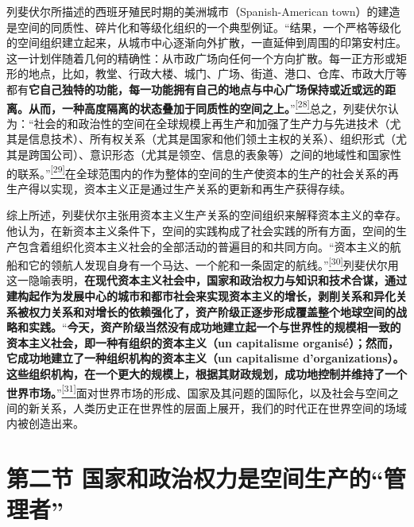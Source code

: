 \documentclass[UTF8, fontset = sourcesans, a4paper, oneside, zihao =
-4, scheme=chinese, no-math, space=true]{ctexbook}
\begin{document}
列斐伏尔所描述的西班牙殖民时期的美洲城市（Spanish-American
town）的建造是空间的同质性、碎片化和等级化组织的一个典型例证。``结果，一个严格等级化的空间组织建立起来，从城市中心逐渐向外扩散，一直延伸到周围的印第安村庄。这一计划伴随着几何的精确性：从市政广场向任何一个方向扩散。每一正方形或矩形的地点，比如，教堂、行政大楼、城门、广场、街道、港口、仓库、市政大厅等都有\textbf{它自己独特的功能，每一功能拥有自己的地点与中心广场保持或近或远的距离。从而，一种高度隔离的状态叠加于同质性的空间之上。}''\protect\hypertarget{part0007_split_001.htmlux5cux23w28}{}{}\protect\hyperlink{part0007_split_004.htmlux5cux23m28}{\textsuperscript{{[}28{]}}}总之，列斐伏尔认为：``社会的和政治性的空间在全球规模上再生产和加强了生产力与先进技术（尤其是信息技术）、所有权关系（尤其是国家和他们领土主权的关系）、组织形式（尤其是跨国公司）、意识形态（尤其是领空、信息的表象等）之间的地域性和国家性的联系。''\protect\hypertarget{part0007_split_001.htmlux5cux23w29}{}{}\protect\hyperlink{part0007_split_004.htmlux5cux23m29}{\textsuperscript{{[}29{]}}}在全球范围内的作为整体的空间的生产使资本的生产的社会关系的再生产得以实现，资本主义正是通过生产关系的更新和再生产获得存续。

综上所述，列斐伏尔主张用资本主义生产关系的空间组织来解释资本主义的幸存。他认为，在新资本主义条件下，空间的实践构成了社会实践的所有方面，空间的生产包含着组织化资本主义社会的全部活动的普遍目的和共同方向。``资本主义的航船和它的领航人发现自身有一个马达、一个舵和一条固定的航线。''\protect\hypertarget{part0007_split_001.htmlux5cux23w30}{}{}\protect\hyperlink{part0007_split_004.htmlux5cux23m30}{\textsuperscript{{[}30{]}}}列斐伏尔用这一隐喻表明，\textbf{在现代资本主义社会中，国家和政治权力与知识和技术合谋，通过建构起作为发展中心的城市和都市社会来实现资本主义的增长，剥削关系和异化关系被权力关系和对增长的依赖强化了，资产阶级正逐步形成覆盖整个地球空间的战略和实践。}``\textbf{今天，资产阶级当然没有成功地建立起一个与世界性的规模相一致的资本主义社会，即一种有组织的资本主义（un
capitalisme organisé）；然而，它成功地建立了一种组织机构的资本主义（un
capitalisme
d'organizations）。这些组织机构，在一个更大的规模上，根据其财政规划，成功地控制并维持了一个世界市场。}''\protect\hypertarget{part0007_split_001.htmlux5cux23w31}{}{}\protect\hyperlink{part0007_split_004.htmlux5cux23m31}{\textsuperscript{{[}31{]}}}面对世界市场的形成、国家及其问题的国际化，以及社会与空间之间的新关系，人类历史正在世界性的层面上展开，我们的时代正在世界空间的场域内被创造出来。

\protect\hypertarget{part0007_split_002.html}{}{}

\hypertarget{part0007_split_002.htmlux5cux23b008}{\section{\texorpdfstring{第二节
国家和政治权力是空间生产的``管理者''}{第二节 国家和政治权力是空间生产的管理者}}\label{part0007_split_002.htmlux5cux23b008}}
\end{document}
